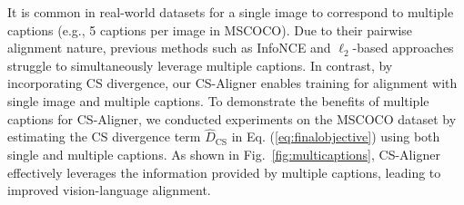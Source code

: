 It is common in real-world datasets for a single image to correspond to multiple captions (e.g., 5 captions per image in MSCOCO). 
Due to their pairwise alignment nature, previous methods such as InfoNCE and \(\ell_2\)-based approaches~\citep{radford2021learning,patel2024eclipse} struggle to simultaneously leverage multiple captions.
In contrast, by incorporating CS divergence, our CS-Aligner enables training for alignment with single image and multiple captions.
To demonstrate the benefits of multiple captions for CS-Aligner, we conducted experiments on the MSCOCO dataset by estimating the CS divergence term \(\widehat{D}_{\text{CS}}\) in Eq. (\ref{eq:finalobjective}) using both single and multiple captions. 
As shown in Fig.~\ref{fig:multicaptions}, CS-Aligner effectively leverages the information provided by multiple captions, leading to improved vision-language alignment. 





